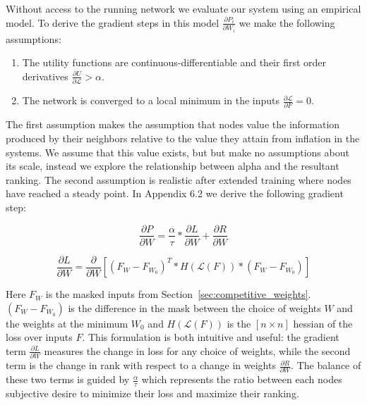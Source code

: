 \documentclass{article}
\begin{document}
Without access to the running network we evaluate our system using an empirical model. To derive the gradient steps in this model $\frac{\partial P_i}{\partial W_i}$ we make the following assumptions: 

\begin{enumerate}
	\item The utility functions are continuous-differentiable and their first order derivatives  $\frac{\partial U}{\partial \mathcal{L}} > \alpha$.    
	\item  The network is converged to a local minimum in the inputs $\frac{\partial\mathcal{L}}{\partial F} = 0$.
\end{enumerate}  

The first assumption makes the assumption that nodes value the information produced by their neighbors relative to the value they attain from inflation in the systems. We assume that this value exists, but but make no assumptions about its scale, instead we explore the relationship between alpha and the resultant ranking. The second assumption is realistic after extended training where nodes have reached a steady point. In Appendix 6.2 we derive the following gradient step:

\begin{equation}
\label{eq:iterative_descent1}
\frac{\partial P}{\partial W} = \frac{\alpha}{\tau} * \frac{\partial L}{\partial W} + \frac{\partial R}{\partial W}
\end{equation}


\begin{equation}
\label{eq:iterative_descent2}
\frac{\partial L}{\partial W} = \frac{\partial}{\partial W} [(F_W - F_{W_0})^T * H( \mathcal{L}(F)) * (F_W - F_{W_0})] 
\end{equation}

Here $F_W$ is the masked inputs from Section~\ref{sec:competitive_weights}. $(F_W - F_{W_0})$ is the difference in the mask between the choice of weights $W$ and the weights at the minimum $W_0$ and $H( \mathcal{L}(F))$ is the $[n \times n]$ hessian of the loss over inputs $F$. This formulation is both intuitive and useful: the gradient term $\frac{\partial L}{\partial W}$ measures the change in loss for any choice of weights, while the second term is the change in rank with respect to a change in weights $\frac{\partial R}{\partial W}$. The balance of these two terms is guided by $\frac{\alpha}{\tau}$ which represents the ratio between each nodes subjective desire to minimize their loss and maximize their ranking.
\end{document}
